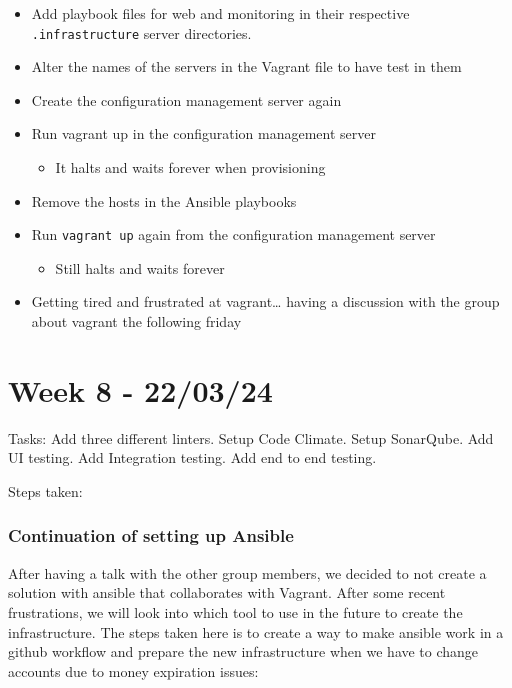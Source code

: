 \begin{itemize}
    \item Add playbook files for web and monitoring in their respective \texttt{.infrastructure} server directories.
    \item Alter the names of the servers in the Vagrant file to have test in them
    \item Create the configuration management server again
    \item Run vagrant up in the configuration management server

    \begin{itemize}
        \item It halts and waits forever when provisioning
    \end{itemize}
    \item Remove the hosts in the Ansible playbooks
    \item Run \texttt{vagrant\ up} again from the configuration management server

    \begin{itemize}
        \item Still halts and waits forever
    \end{itemize}
    \item Getting tired and frustrated at vagrant\ldots{} having a discussion with the group about vagrant the following friday
\end{itemize}

\section{Week 8 - 22/03/24}
\label{log:week8}

Tasks: Add three different linters. Setup Code Climate. Setup SonarQube.
Add UI testing. Add Integration testing. Add end to end testing.

Steps taken:

\subsubsection{Continuation of setting up Ansible}
\label{log:continuation-of-setting-up-ansible}

After having a talk with the other group members, we decided to not
create a solution with ansible that collaborates with Vagrant. After
some recent frustrations, we will look into which tool to use in the
future to create the infrastructure. The steps taken here is to create a
way to make ansible work in a github workflow and prepare the new
infrastructure when we have to change accounts due to money expiration
issues:

